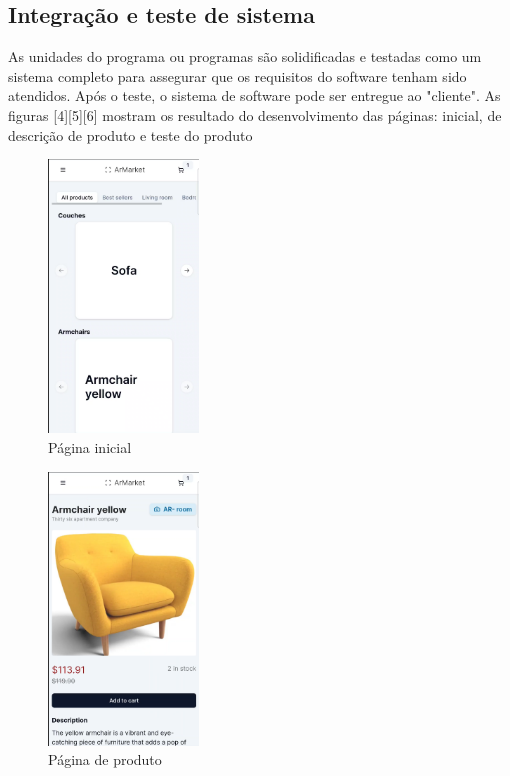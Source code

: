 \documentclass[conference]{IEEEtran}
\begin{document}
\subsection{Integração e teste de sistema}
As unidades do programa ou programas são solidificadas e testadas como um
sistema completo para assegurar que os requisitos do software tenham sido
atendidos. Após o teste, o sistema de software pode ser entregue ao "cliente".
As figuras [4][5][6] mostram os resultado do desenvolvimento das páginas:
inicial, de descrição de produto e teste do produto
\begin{figure}[h]
  \caption{Página inicial}

  \centering %
  \includegraphics[width=4cm]{assets/home_page.png}
\end{figure}
\begin{figure}[h]
  \caption{Página de produto}

  \centering %
  \includegraphics[width=4cm]{assets/product_page.png}
\end{figure}
\end{document}
